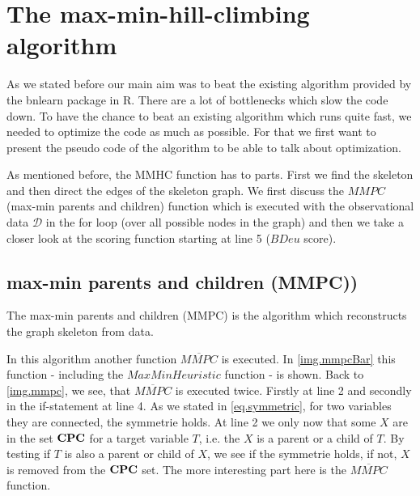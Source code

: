 			 \label{img.delete}
			

\chapter{The max-min-hill-climbing algorithm}

	As we stated before our main aim was to beat the existing algorithm provided by the bnlearn package in R. There are a lot of bottlenecks which slow the code down. To have the chance to beat an existing algorithm which runs quite fast, we needed to optimize the code as much as possible. For that we first want to present the pseudo code of the algorithm to be able to talk about optimization.

	 \label{img.mmhc}

	As mentioned before, the MMHC function has to parts. First we find the skeleton and then direct the edges of the skeleton graph. We first discuss the $MMPC$ (max-min parents and children) function which is executed with the observational data $\mathcal{D}$ in the for loop (over all possible nodes in the graph) and then we take a closer look at the scoring function starting at line 5 ($BDeu$ score).

		\section{max-min parents and children (MMPC))}

			The max-min parents and children (MMPC) is the algorithm which reconstructs the graph skeleton from data.%

			 \label{img.mmpc}

			In this algorithm another function $\overline{MMPC}$ is executed. In \autoref{img.mmpcBar} this function - including the $MaxMinHeuristic$ function - is shown. Back to \autoref{img.mmpc}, we see, that $\overline{MMPC}$ is executed twice. Firstly at line 2 and secondly in the if-statement at line 4. As we stated in \autoref{eq.symmetric}, for two variables they are connected, the symmetrie holds. At line 2 we only now that some $X$ are in the set ${\textbf{CPC}}$ for a target variable $T$, i.e. the $X$ is a parent or a child of $T$. By testing if $T$ is also a parent or child of $X$, we see if the symmetrie holds, if not, $X$ is removed from the ${\textbf{CPC}}$ set. The more interesting part here is the $\overline{MMPC}$ function.

